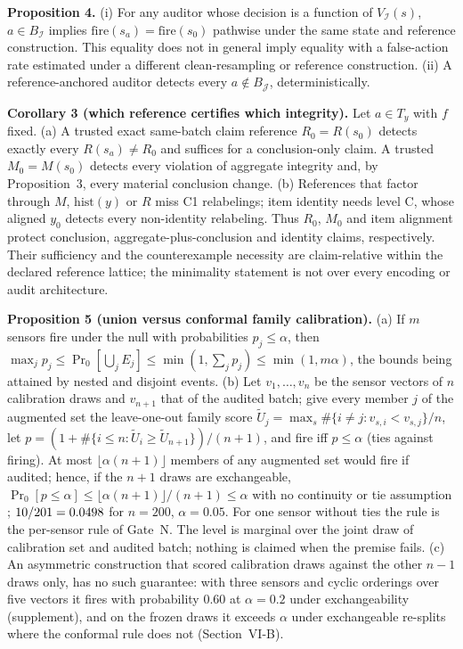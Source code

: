 \documentclass[10pt,journal,compsoc]{IEEEtran}
\begin{document}
\textbf{Proposition 4.} (i) For any auditor whose decision is a function of
$V_{\mathcal I}(s)$, $a\in B_{\mathcal I}$ implies
$\mathrm{fire}(s_a)=\mathrm{fire}(s_0)$ pathwise under the same state and
reference construction. This equality does not in general imply equality with
a false-action rate estimated under a different clean-resampling or reference
construction. (ii) A reference-anchored auditor
detects every $a\notin B_{\mathcal J}$, deterministically.

\textbf{Corollary 3 (which reference certifies which integrity).} Let
$a\in T_y$ with $f$ fixed. (a) A trusted exact same-batch claim reference
$R_0=R(s_0)$ detects exactly every $R(s_a)\ne R_0$ and suffices for a
conclusion-only claim. A trusted $M_0=M(s_0)$ detects every violation of aggregate integrity
and, by Proposition~3, every material conclusion change. (b) References that
factor through $M$, $\mathrm{hist}(y)$ or $R$ miss C1 relabelings; item identity
needs level C, whose aligned $y_0$ detects every non-identity relabeling. Thus
$R_0$, $M_0$ and item alignment protect conclusion, aggregate-plus-conclusion
and identity claims, respectively. Their sufficiency and the counterexample
necessity are claim-relative within the declared reference lattice; the
minimality statement is not over every encoding or audit architecture.

\textbf{Proposition 5 (union versus conformal family calibration).} (a) If
$m$ sensors fire under the null with probabilities $p_j\le\alpha$, then
$\max_j p_j\le\Pr_0[\bigcup_j E_j]\le\min(1,\sum_j p_j)\le\min(1,m\alpha)$,
the bounds being attained by nested and disjoint events. (b) Let $v_1,\dots,v_n$ be the sensor vectors of $n$
calibration draws and $v_{n+1}$ that of the audited batch; give every member
$j$ of the augmented set the leave-one-out family score
$\tilde U_j=\max_{s}\#\{i\ne j: v_{s,i}<v_{s,j}\}/n$, let
$p=(1+\#\{i\le n:\tilde U_i\ge\tilde U_{n+1}\})/(n+1)$, and fire iff
$p\le\alpha$ (ties against firing). At most $\lfloor\alpha(n+1)\rfloor$
members of any augmented set would fire if audited; hence, if the $n+1$ draws
are exchangeable, $\Pr_0[p\le\alpha]\le\lfloor\alpha(n+1)\rfloor/(n+1)\le\alpha$
with no continuity or tie assumption \cite{Vovk2005,Tippett1931,Westfall1993};
$10/201=0.0498{}$ for $n=200$, $\alpha=0.05$. For one sensor without
ties the rule is the per-sensor rule of Gate~N. The level is marginal over
the joint draw of calibration set and audited batch; nothing is claimed when
the premise fails. (c) An asymmetric construction that
scored calibration draws against the other $n-1$ draws only, has no such
guarantee: with three sensors and cyclic orderings over five vectors it fires
with probability $0.60$ at $\alpha=0.2$ under exchangeability (supplement),
and on the frozen draws it exceeds $\alpha$ under exchangeable re-splits where
the conformal rule does not (Section~VI-B).
\end{document}
